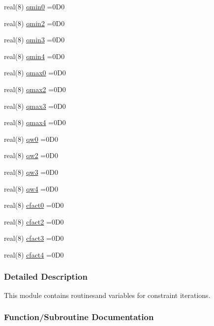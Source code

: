 \begin{DoxyCompactItemize}
\item 
real(8) \hyperlink{namespaceconstr_ac52c340509e8bedd691c20cc9be67934}{qmin0} =0\+D0
\item 
real(8) \hyperlink{namespaceconstr_a7683d16fd08be543d6dda9c32e6a3eea}{qmin2} =0\+D0
\item 
real(8) \hyperlink{namespaceconstr_aea591e60298cd3b40646923a1d91885f}{qmin3} =0\+D0
\item 
real(8) \hyperlink{namespaceconstr_a0e331fe923c308ed2f8d34f3124d7c6e}{qmin4} =0\+D0
\item 
real(8) \hyperlink{namespaceconstr_aadabc5bc09c3392f9c3270c23730c058}{qmax0} =0\+D0
\item 
real(8) \hyperlink{namespaceconstr_a066ca2e91e314548af79d5d21de0f379}{qmax2} =0\+D0
\item 
real(8) \hyperlink{namespaceconstr_a05af2891f745e5c96eab416183d9fc47}{qmax3} =0\+D0
\item 
real(8) \hyperlink{namespaceconstr_aa0342fbb3aba37cf00c90a73295852b5}{qmax4} =0\+D0
\item 
real(8) \hyperlink{namespaceconstr_a161ed801cc9ba0cce6a99c1f538b1f11}{qw0} =0\+D0
\item 
real(8) \hyperlink{namespaceconstr_ab35bdc97e1451a6829b2a06c5ffb60a1}{qw2} =0\+D0
\item 
real(8) \hyperlink{namespaceconstr_a7e725c2dd7ba2a518ad31afe2a64da7d}{qw3} =0\+D0
\item 
real(8) \hyperlink{namespaceconstr_adcfe684411ef071acb9b6f175ab03de9}{qw4} =0\+D0
\item 
real(8) \hyperlink{namespaceconstr_a17bf2198be05743793e7087222c361fc}{cfact0} =0\+D0
\item 
real(8) \hyperlink{namespaceconstr_a591b901ac5754962e45ddc92731c2146}{cfact2} =0\+D0
\item 
real(8) \hyperlink{namespaceconstr_a15601a01ae3ca3eb08a1601dd4e438ce}{cfact3} =0\+D0
\item 
real(8) \hyperlink{namespaceconstr_ab4830c64d138d923cb6d11dfb07645f1}{cfact4} =0\+D0
\end{DoxyCompactItemize}


\subsubsection{Detailed Description}
This module contains routinesand variables for constraint iterations. 

\subsubsection{Function/\+Subroutine Documentation}
